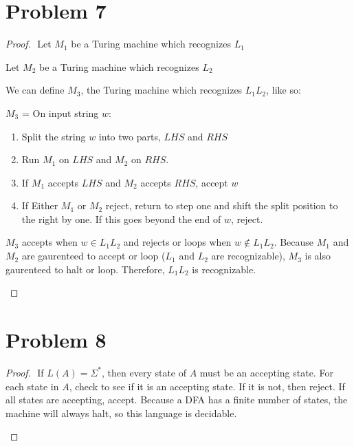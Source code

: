 \documentclass{article}
\newenvironment{problem}[1]{
  \nobreak\section*{Problem #1}
}{}
\begin{document}
  \begin{problem}{7}
    \begin{proof}
      $ $\newline
      Let $M_1$ be a Turing machine which recognizes $L_1$

      \noindent
      Let $M_2$ be a Turing machine which recognizes $L_2$

      \noindent
      We can define $M_3$, the Turing machine which recognizes
      $L_1L_2$, like so:

      \begin{center}
        $M_3$ = On input string $w$: \begin{enumerate}
          \item Split the string $w$ into two parts, $LHS$ and $RHS$
          \item Run $M_1$ on $LHS$ and $M_2$ on $RHS$.
          \item If $M_1$ accepts $LHS$ and $M_2$ accepts $RHS$, accept $w$
          \item If Either $M_1$ or $M_2$ reject, return to step one and shift the split position to the right by one.  If this goes beyond the end of $w$, reject.
        \end{enumerate}
      \end{center}

      \noindent
      $M_3$ accepts when $w \in L_1L_2$ and rejects or loops when
      $w \notin L_1L_2$.  Because $M_1$ and $M_2$ are
      gaurenteed to accept or loop ($L_1$ and $L_2$ are recognizable), $M_3$ is
      also gaurenteed to halt or loop.  Therefore, $L_1L_2$ is
      recognizable.

      $ $\newline
    \end{proof}
  \end{problem}

  \begin{problem}{8}
    \begin{proof}
      $ $\newline
      If $L(A) = \Sigma^*$, then every state of $A$ must be an
      accepting state.  For each state in $A$, check to see if
      it is an accepting state.  If it is not, then reject.  If
      all states are accepting, accept.  Because a DFA has a
      finite number of states, the machine will always halt, so
      this language is decidable.

      $ $\newline
    \end{proof}
  \end{problem}
\end{document}
